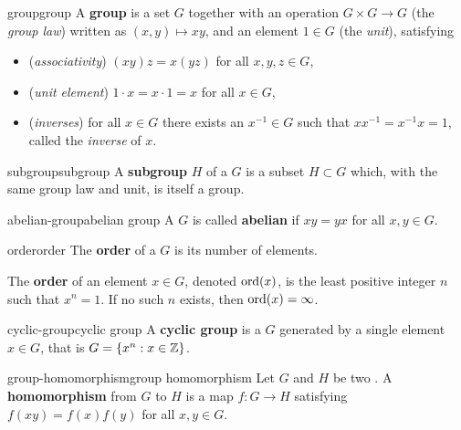 \begin{topic}{group}{group}
    A \textbf{group} is a set $G$ together with an operation $G \times G \to G$ (the \textit{group law}) written as $(x, y) \mapsto xy$, and an element $1 \in G$ (the \textit{unit}), satisfying
    \begin{itemize}
        \item (\textit{associativity}) $(xy)z = x(yz)$ for all $x, y, z \in G$,
        \item (\textit{unit element}) $1 \cdot x = x \cdot 1 = x$ for all $x \in G$,
        \item (\textit{inverses}) for all $x \in G$ there exists an $x^{-1} \in G$ such that $x x^{-1} = x^{-1} x = 1$, called the \textit{inverse} of $x$.
    \end{itemize}
\end{topic}

\begin{topic}{subgroup}{subgroup}
    A \textbf{subgroup} $H$ of a  $G$ is a subset $H \subset G$ which, with the same group law and unit, is itself a group.
\end{topic}

\begin{topic}{abelian-group}{abelian group}
    A  $G$ is called \textbf{abelian} if $xy = yx$ for all $x, y \in G$.
\end{topic}

\begin{topic}{order}{order}
    The \textbf{order} of a  $G$ is its number of elements.
    
    The \textbf{order} of an element $x \in G$, denoted $\textup{ord}(x)$, is the least positive integer $n$ such that $x^n = 1$. If no such $n$ exists, then $\textup{ord}(x) = \infty$.
\end{topic}

\begin{topic}{cyclic-group}{cyclic group}
    A \textbf{cyclic group} is a  $G$ generated by a single element $x \in G$, that is $G = \{ x^n : x \in \mathbb{Z} \}$.
\end{topic}

\begin{topic}{group-homomorphism}{group homomorphism}
    Let $G$ and $H$ be two . A \textbf{homomorphism} from $G$ to $H$ is a map $f \colon G \to H$ satisfying $f(xy) = f(x) f(y)$ for all $x, y \in G$.
\end{topic}

